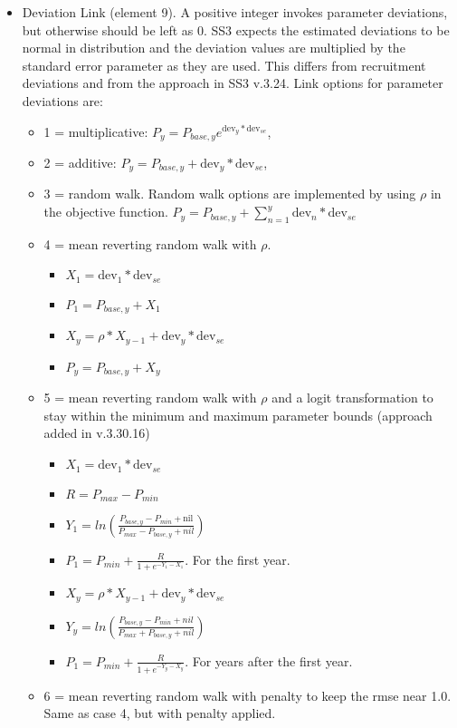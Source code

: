 \begin{itemize}
\item Deviation Link (element 9). A positive integer invokes parameter deviations, but otherwise should be left as 0. SS3 expects the estimated deviations to be normal in distribution and the deviation values are multiplied by the standard error parameter as they are used. This differs from recruitment deviations and from the approach in SS3 v.3.24. Link options for parameter deviations are:
	\begin{itemize}
		\item 1 = multiplicative: $P_y = P_{base,y}e^{\text{dev}_y*\text{dev}_{se}}$,
		\item 2 = additive: $P_y = P_{base,y} + \text{dev}_y*\text{dev}_{se}$,
		\item 3 = random walk. Random walk options are implemented by using $\rho$ in the objective function. $P_y = P_{base,y} + \sum_{n=1}^{y} \text{dev}_n*\text{dev}_{se}$
		\item 4 = mean reverting random walk with $\rho$.
		\begin{itemize}
		    \item $X_1 = \text{dev}_1*\text{dev}_{se}$
			\item $P_1 = P_{base,y} + X_1$
			\item $X_y = \rho*X_{y-1} + \text{dev}_y*\text{dev}_{se}$
			\item $P_y = P_{base,y} + X_y$
		\end{itemize}
		\item 5 = mean reverting random walk with $\rho$ and a logit transformation to stay within the minimum and maximum parameter bounds (approach added in v.3.30.16)
	    \begin{itemize}
		    \item $X_1 = \text{dev}_1*\text{dev}_{se}$
			\item $R = P_{max} - P_{min}$
			\item $Y_1 = ln(\frac{P_{base,y} - P_{min} + \text{nil}}{P_{max} - P_{base,y} + nil})$
			\item $P_1 = P_{min} + \frac{R}{1 + e^{-Y_1 - X_1 }}$. For the first year.
			\item $X_y = \rho*X_{y-1} + \text{dev}_y*\text{dev}_{se}$ 
			\item $Y_y = ln(\frac{P_{base,y} - P_{min} + nil}{P_{max} + P_{base,y} + nil})$
			\item $P_1 = P_{min} + \frac{R}{1 + e^{-Y_y - X_y }}$. For years after the first year.
		\end{itemize}
		\item 6 = mean reverting random walk with penalty to keep the \gls{rmse} near 1.0. Same as case 4, but with penalty applied.

\end{itemize}
\end{itemize}
